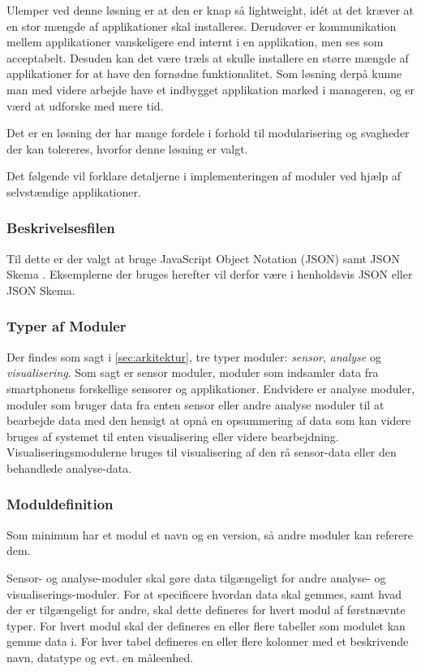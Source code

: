 Ulemper ved denne løsning er at den er knap så lightweight, idét at det kræver at en stor mængde af applikationer skal installeres.
Derudover er kommunikation mellem applikationer vanskeligere end internt i en applikation, men ses som acceptabelt.
Desuden kan det være træls at skulle installere en større mængde af applikationer for at have den fornødne funktionalitet.
Som løsning derpå kunne man med videre arbejde have et indbygget applikation marked i manageren, og er værd at udforske med mere tid.

Det er en løsning der har mange fordele i forhold til modularisering og svagheder der kan tolereres, hvorfor denne løsning er valgt. 

Det følgende vil forklare detaljerne i implementeringen af moduler ved hjælp af selvstændige applikationer.

\subsubsection{Beskrivelsesfilen}

Til dette er der valgt at bruge JavaScript Object Notation (JSON) samt JSON Skema \citep{jsonpojo}.
Eksemplerne der bruges herefter vil derfor være i henholdsvis JSON eller JSON Skema.

\subsubsection{Typer af Moduler}
Der findes som sagt i \cref{sec:arkitektur}, tre typer moduler: \textit{sensor}, \textit{analyse} og \textit{visualisering}.
Som sagt er sensor moduler, moduler som indsamler data fra smartphonens forskellige sensorer og applikationer.
Endvidere er analyse moduler, moduler som bruger data fra enten sensor eller andre analyse moduler til at bearbejde data med den hensigt at opnå en opsummering af data som kan videre bruges af systemet til enten visualisering eller videre bearbejdning.
Visualiseringsmodulerne bruges til visualisering af den rå sensor-data eller den behandlede analyse-data.

\subsubsection{Moduldefinition}
Som minimum har et modul et navn og en version, så andre moduler kan referere dem.

Sensor- og analyse-moduler skal gøre data tilgængeligt for andre analyse- og visualiserings-moduler.
For at specificere hvordan data skal gemmes, samt hvad der er tilgængeligt for andre, skal dette defineres for hvert modul af førstnævnte typer.
For hvert modul skal der defineres en eller flere tabeller som modulet kan gemme data i.
For hver tabel defineres en eller flere kolonner med et beskrivende navn, datatype og evt. en måleenhed.

